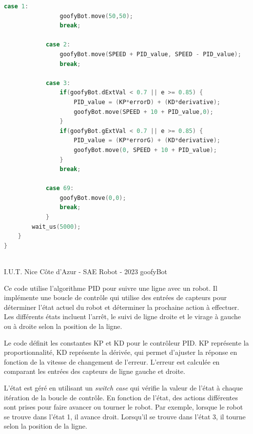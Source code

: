 \begin{lstlisting}[language={C++}, caption={Fonction suivi()}, label={suivi.cpp}]
            case 1:
                goofyBot.move(50,50);
                break;

            case 2:
                goofyBot.move(SPEED + PID_value, SPEED - PID_value);
                break;

            case 3:
                if(goofyBot.dExtVal < 0.7 || e >= 0.85) {
                    PID_value = (KP*errorD) + (KD*derivative);
                    goofyBot.move(SPEED + 10 + PID_value,0);
                }
                if(goofyBot.gExtVal < 0.7 || e >= 0.85) {
                    PID_value = (KP*errorG) + (KD*derivative);
                    goofyBot.move(0, SPEED + 10 + PID_value);
                }
                break;

            case 69: 
                goofyBot.move(0,0);
                break;
            }
        wait_us(5000);
    }
}
\end{lstlisting}

\vfill
\noindent\makebox[\linewidth]{\rule{.8\paperwidth}{.6pt}}\\[0.2cm]
I.U.T. Nice Côte d'Azur - SAE Robot - 2023 \hfill goofyBot
\noindent\makebox[\linewidth]{\rule{.8\paperwidth}{.6pt}}
\newpage

Ce code utilise l'algorithme PID pour suivre une ligne avec un robot. Il implémente une boucle de contrôle qui utilise des entrées de capteurs pour déterminer l'état actuel du robot et déterminer la prochaine action à effectuer. Les différents états incluent l'arrêt, le suivi de ligne droite et le virage à gauche ou à droite selon la position de la ligne.

Le code définit les constantes KP et KD pour le contrôleur PID. KP représente la proportionnalité, KD représente la dérivée, qui permet d'ajuster la réponse en fonction de la vitesse de changement de l'erreur. L'erreur est calculée en comparant les entrées des capteurs de ligne gauche et droite.

L'état est géré en utilisant un \emph{switch case} qui vérifie la valeur de l'état à chaque itération de la boucle de contrôle. En fonction de l'état, des actions différentes sont prises pour faire avancer ou tourner le robot. Par exemple, lorsque le robot se trouve dans l'état 1, il avance droit. Lorsqu'il se trouve dans l'état 3, il tourne selon la position de la ligne.

